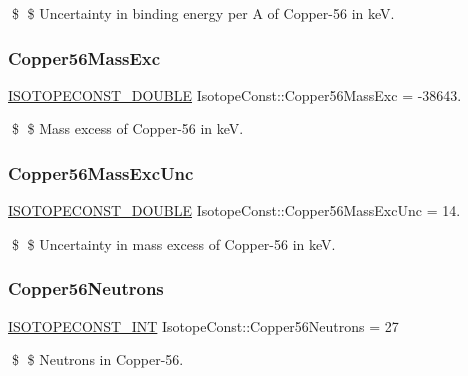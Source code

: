 \$ \$ Uncertainty in binding energy per A of Copper-\/56 in keV. \mbox{\label{group___isotope_const-_copper-_cu56_gae509dba34f013326dfed86730a892e3e}} 
\subsubsection{\texorpdfstring{Copper56\+Mass\+Exc}{Copper56MassExc}}
{\footnotesize\ttfamily \mbox{\hyperlink{group___isotope_const-_macros_ga8f45a7272ce02c0b4c65c44636ed719a}{I\+S\+O\+T\+O\+P\+E\+C\+O\+N\+S\+T\+\_\+\+D\+O\+U\+B\+LE}} Isotope\+Const\+::\+Copper56\+Mass\+Exc = -\/38643.}

\$ \$ Mass excess of Copper-\/56 in keV. \mbox{\label{group___isotope_const-_copper-_cu56_ga6c6ff7ced54857455b6f19650ec71af0}} 
\subsubsection{\texorpdfstring{Copper56\+Mass\+Exc\+Unc}{Copper56MassExcUnc}}
{\footnotesize\ttfamily \mbox{\hyperlink{group___isotope_const-_macros_ga8f45a7272ce02c0b4c65c44636ed719a}{I\+S\+O\+T\+O\+P\+E\+C\+O\+N\+S\+T\+\_\+\+D\+O\+U\+B\+LE}} Isotope\+Const\+::\+Copper56\+Mass\+Exc\+Unc = 14.}

\$ \$ Uncertainty in mass excess of Copper-\/56 in keV. \mbox{\label{group___isotope_const-_copper-_cu56_gaa6ebeeeeae8e2ee9d04ce624d8af5e45}} 
\subsubsection{\texorpdfstring{Copper56\+Neutrons}{Copper56Neutrons}}
{\footnotesize\ttfamily \mbox{\hyperlink{group___isotope_const-_macros_ga5f18360b3e99483a35c32d789e62621c}{I\+S\+O\+T\+O\+P\+E\+C\+O\+N\+S\+T\+\_\+\+I\+NT}} Isotope\+Const\+::\+Copper56\+Neutrons = 27}

\$ \$ Neutrons in Copper-\/56. \mbox{\label{group___isotope_const-_copper-_cu56_gaff6b190a9ff824d1b5dc349e4baef29e}} 
